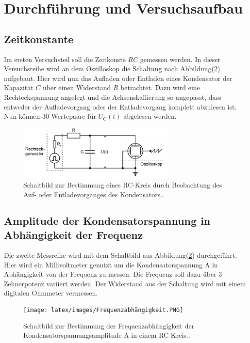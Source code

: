 \section{Durchführung und Versuchsaufbau}

    \subsection{Zeitkonstante}

        \noindent Im ersten Versuchsteil soll die Zeitkonste $RC$ gemessen werden. In dieser Versuchsreihe wird an dem Oszilloskop die Schaltung nach 
        Abbildung(\ref{img:Zeit}) aufgebaut. Hier wird nun das Aufladen oder Entladen eines Kondensator der Kapazität $C$ über einen Widerstand 
        $R$ betrachtet. Dazu wird eine Rechteckspannung angelegt und die Achsenskallierung so angepasst, dass entweder der Aufladevorgang oder der 
        Entladevorgang komplett abzulesen ist. Nun können 30 Wertepaare für $U_{\text{C}}(t)$ abgelesen werden. 

        \begin{figure}
            \centering
            \includegraphics[width=0.7\textwidth]{latex/images/Zeitkonstante.PNG}
            \caption{Schaltbild zur Bestimmung eines RC-Kreis durch Beobachtung des Auf- oder Entladevorganges des Kondensators.\protect \cite{V353}.}
            \label{img:Zeit}
        \end{figure}

    \subsection{Amplitude der Kondensatorspannung in Abhängigkeit der Frequenz}

        \noindent Die zweite Messreihe wird mit dem Schaltbild aus Abbildung(\ref{img:Zeit}) durchgeführt. Hier wird ein Millivoltmeter genutzt 
        um die Kondensatorspannung A in Abhängigkeit von der Frequenz zu messen. Die Frequenz soll dazu über 3 Zehnerpotenz variiert werden. Der 
        Widerstand aus der Schaltung wird mit einem digitalen Ohmmeter vermessen. 

        \begin{figure}
            \centering
            \texttt{[image: latex/images/Frequenzabhängigkeit.PNG]}
            \caption{Schaltbild zur Bestimmung der Frequenzabhängigkeit der Kondensatorspannungsamplitude A in einem RC-Kreis.\protect \cite{V353}.}
            \label{img:Zeit}
        \end{figure}

